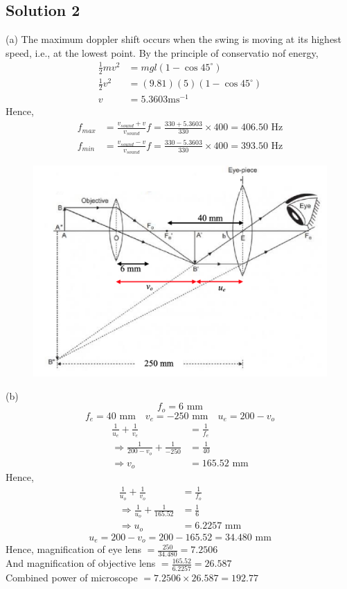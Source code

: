 \documentclass{article}
\begin{document}
\subsection{Solution 2}
(a) The maximum doppler shift occurs when the swing is moving at its highest speed, i.e., at the lowest point. By the principle of conservatio nof energy,
\begin{align}
	\frac{1}{2} mv^2 &= mgl \left(1-\cos 45^\circ \right)\\
	\frac{1}{2} v^2 &= (9.81)(5) \left(1-\cos 45^\circ \right)\\
	v &= 5.3603 \text{ms}^{-1}
\end{align}
Hence,
\begin{align}
	f_{max} & = \frac{v_{sound}+v}{v_{sound}} f = \frac{330+5.3603}{330} \times 400 = 406.50 \text{ Hz} \\
	f_{min} & = \frac{v_{sound}-v}{v_{sound}} f = \frac{330-5.3603}{330} \times 400 = 393.50 \text{ Hz}
\end{align}
\begin{figure}
	\centering
	\includegraphics[width=\linewidth]{spho_book_TYS_images/2020q2.png}
\end{figure}
(b) 
\[f_o = 6 \text{ mm}\]
\[f_e = 40 \text{ mm} \quad v_e = -250 \text{ mm} \quad u_e = 200 - v_o \]
\begin{align}
	\frac{1}{u_e} + \frac{1}{v_e} &= \frac{1}{f_e} \\
	\Rightarrow	\frac{1}{200-v_o} + \frac{1}{-250} &= \frac{1}{40} \\
	\Rightarrow v_o &= 165.52 \text{ mm}
\end{align}
Hence,
\begin{align}
	\frac{1}{u_o} + \frac{1}{v_o} &= \frac{1}{f_o} \\
	\Rightarrow	\frac{1}{u_o} + \frac{1}{165.52} &= \frac{1}{6} \\
	\Rightarrow u_o &= 6.2257 \text{ mm}
\end{align}
\[u_e = 200-v_o = 200-165.52 = 34.480 \text{ mm}\]
Hence, magnification of eye lens $= \frac{250}{34.480} = 7.2506$ \\
And magnification of objective lens $ = \frac{165.52}{6.2257} = 26.587$ \\
Combined power of microscope $= 7.2506 \times 26.587 = 192.77 $
\end{document}
